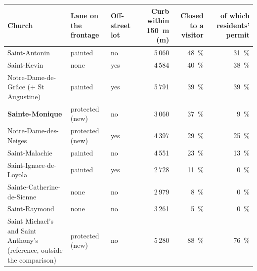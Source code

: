 \begin{tabular}{@{}>{\raggedright\arraybackslash}p{4.6cm}>{\raggedright\arraybackslash}p{2.6cm}>{\raggedright\arraybackslash}p{1.7cm}rrr@{}}\toprule
Church & Lane on the frontage & Off-street lot & Curb within 150~m (m) & Closed to a visitor & of which residents' permit \\\midrule
Saint-Antonin & painted & no & 5\,060 & 48~\% & 31~\% \\
Saint-Kevin & none & yes & 4\,584 & 40~\% & 38~\% \\
Notre-Dame-de-Grâce (+ St Augustine) & painted & yes & 5\,791 & 39~\% & 39~\% \\
\textbf{Sainte-Monique} & protected (new) & no & 3\,060 & 37~\% & 9~\% \\
Notre-Dame-des-Neiges & protected (new) & yes & 4\,397 & 29~\% & 25~\% \\
Saint-Malachie & painted & no & 4\,551 & 23~\% & 13~\% \\
Saint-Ignace-de-Loyola & painted & yes & 2\,728 & 11~\% & 0~\% \\
Sainte-Catherine-de-Sienne & none & no & 2\,979 & 8~\% & 0~\% \\
Saint-Raymond & none & no & 3\,261 & 5~\% & 0~\% \\
\midrule
Saint Michael's and Saint Anthony's (reference, outside the comparison) & protected (new) & no & 5\,280 & 88~\% & 76~\% \\
\bottomrule
\end{tabular}
